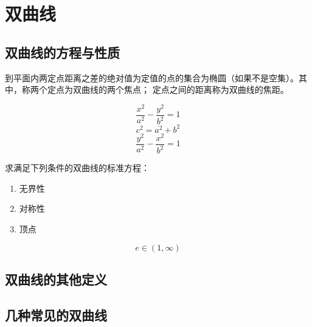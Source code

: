 \section{双曲线}
\subsection{双曲线的方程与性质}
\begin{definition}[双曲线的第一定义]
    到平面内两定点距离之差的绝对值为定值的点的集合为椭圆（如果不是空集）。其中，称两个定点为双曲线的两个焦点；
    定点之间的距离称为双曲线的焦距。
\end{definition}
\begin{theorem}[双曲线的标准方程]
    \begin{equation}
        \frac{x^2}{a^2}-\frac{y^2}{b^2}=1 
    \end{equation}
    \begin{equation}
        c^2=a^2+b^2
    \end{equation}
    \begin{equation}
        \frac{y^2}{a^2}-\frac{x^2}{b^2}=1 
    \end{equation}
\end{theorem}
\begin{example}
    求满足下列条件的双曲线的标准方程：
\end{example}

\begin{character}[双曲线的性质]
\begin{enumerate}
    \item 无界性
    \item 对称性
    \item 顶点
\end{enumerate}
\end{character}

\begin{theorem}[双曲线的离心率]
    \begin{equation}
        e\in (1,\infty)
    \end{equation}

\end{theorem}

\begin{definition}[通径]
    
\end{definition}

\clearpage
\clearpage
\subsection{双曲线的其他定义}
\clearpage
\clearpage
\subsection{几种常见的双曲线}
\clearpage
